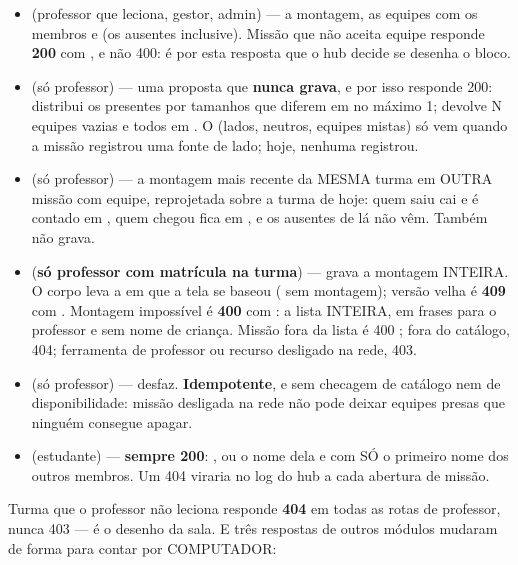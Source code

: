 \begin{itemize}
  \item {} (professor que leciona,
    gestor, admin) --- a montagem, as equipes com os membros e 
    (os ausentes inclusive). Missão que não aceita equipe responde \textbf{200}
    com , e não 400: é por esta resposta que o hub decide se
    desenha o bloco.
  \item {} (só professor) --- uma proposta que
    \textbf{nunca grava}, e por isso responde 200:  distribui os
    presentes por tamanhos que diferem em no máximo 1;  devolve N
    equipes vazias e todos em . O  (lados, neutros,
    equipes mistas) só vem quando a missão registrou uma fonte de lado; hoje,
    nenhuma registrou.
  \item {} (só professor) --- a montagem mais recente da MESMA
    turma em OUTRA missão com equipe, reprojetada sobre a turma de hoje: quem
    saiu cai e é contado em , quem chegou fica em , e
    os ausentes de lá não vêm. Também não grava.
  \item {} (\textbf{só professor com matrícula na turma}) --- grava
    a montagem INTEIRA. O corpo leva a  em que a tela se baseou
    ( sem montagem); versão velha é \textbf{409}
     com . Montagem impossível é
    \textbf{400}  com : a lista INTEIRA, em
    frases para o professor e sem nome de criança. Missão fora da lista é 400
    ; fora do catálogo, 404; ferramenta de professor ou
    recurso desligado na rede, 403.
  \item {} (só professor) --- desfaz. \textbf{Idempotente}, e
    sem checagem de catálogo nem de disponibilidade: missão desligada na rede
    não pode deixar equipes presas que ninguém consegue apagar.
  \item {} (estudante) --- \textbf{sempre 200}:
    , ou o nome dela e  com SÓ o primeiro nome dos
    outros membros. Um 404 viraria  no log do hub a cada
    abertura de missão.
\end{itemize}

Turma que o professor não leciona responde \textbf{404} em todas as rotas de
professor, nunca 403 --- é o desenho da sala. E três respostas de outros módulos
mudaram de forma para contar por COMPUTADOR:


